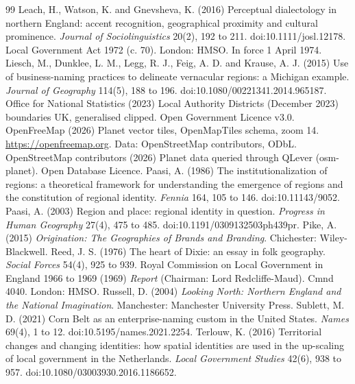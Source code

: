 \documentclass[11pt,a4paper]{article}
\begin{document}
\begin{thebibliography}{99}
 Leach, H., Watson, K. and Gnevsheva, K. (2016) Perceptual dialectology in northern England: accent recognition, geographical proximity and cultural prominence. \textit{Journal of Sociolinguistics} 20(2), 192 to 211. doi:10.1111/josl.12178.
 Local Government Act 1972 (c. 70). London: HMSO. In force 1 April 1974.
 Liesch, M., Dunklee, L. M., Legg, R. J., Feig, A. D. and Krause, A. J. (2015) Use of business-naming practices to delineate vernacular regions: a Michigan example. \textit{Journal of Geography} 114(5), 188 to 196. doi:10.1080/00221341.2014.965187.
 Office for National Statistics (2023) Local Authority Districts (December 2023) boundaries UK, generalised clipped. Open Government Licence v3.0.
 OpenFreeMap (2026) Planet vector tiles, OpenMapTiles schema, zoom 14. \url{https://openfreemap.org}. Data: OpenStreetMap contributors, ODbL.
 OpenStreetMap contributors (2026) Planet data queried through QLever (osm-planet). Open Database Licence.
 Paasi, A. (1986) The institutionalization of regions: a theoretical framework for understanding the emergence of regions and the constitution of regional identity. \textit{Fennia} 164, 105 to 146. doi:10.11143/9052.
 Paasi, A. (2003) Region and place: regional identity in question. \textit{Progress in Human Geography} 27(4), 475 to 485. doi:10.1191/0309132503ph439pr.
 Pike, A. (2015) \textit{Origination: The Geographies of Brands and Branding}. Chichester: Wiley-Blackwell.
 Reed, J. S. (1976) The heart of Dixie: an essay in folk geography. \textit{Social Forces} 54(4), 925 to 939.
 Royal Commission on Local Government in England 1966 to 1969 (1969) \textit{Report} (Chairman: Lord Redcliffe-Maud). Cmnd 4040. London: HMSO.
 Russell, D. (2004) \textit{Looking North: Northern England and the National Imagination}. Manchester: Manchester University Press.
 Sublett, M. D. (2021) Corn Belt as an enterprise-naming custom in the United States. \textit{Names} 69(4), 1 to 12. doi:10.5195/names.2021.2254.
 Terlouw, K. (2016) Territorial changes and changing identities: how spatial identities are used in the up-scaling of local government in the Netherlands. \textit{Local Government Studies} 42(6), 938 to 957. doi:10.1080/03003930.2016.1186652.

\end{thebibliography}
\end{document}
